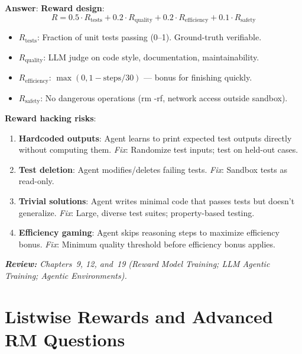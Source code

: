 \begin{questionbox}
\textbf{Answer}: \textbf{Reward design}: 
\[
R = 0.5 \cdot R_{\text{tests}} + 0.2 \cdot R_{\text{quality}} + 0.2 \cdot R_{\text{efficiency}} + 0.1 \cdot R_{\text{safety}}
\]

\begin{itemize}
  \item $R_{\text{tests}}$: Fraction of unit tests passing (0--1). Ground-truth verifiable.
  \item $R_{\text{quality}}$: LLM judge on code style, documentation, maintainability.
  \item $R_{\text{efficiency}}$: $\max(0, 1 - \text{steps}/30)$ --- bonus for finishing quickly.
  \item $R_{\text{safety}}$: No dangerous operations (rm -rf, network access outside sandbox).
\end{itemize}

\textbf{Reward hacking risks}:

\begin{enumerate}
  \item \textbf{Hardcoded outputs}: Agent learns to print expected test outputs directly without computing them. \emph{Fix}: Randomize test inputs; test on held-out cases.
  \item \textbf{Test deletion}: Agent modifies/deletes failing tests. \emph{Fix}: Sandbox tests as read-only.
  \item \textbf{Trivial solutions}: Agent writes minimal code that passes tests but doesn’t generalize. \emph{Fix}: Large, diverse test suites; property-based testing.
  \item \textbf{Efficiency gaming}: Agent skips reasoning steps to maximize efficiency bonus. \emph{Fix}: Minimum quality threshold before efficiency bonus applies.
\end{enumerate}

\emph{\textbf{Review:} Chapters~9, 12, and~19 (Reward Model Training; LLM Agentic Training; Agentic Environments).}
\end{questionbox}

\section{Listwise Rewards and Advanced RM Questions}
\label{listwise-rewards-and-advanced-rm-questions}

